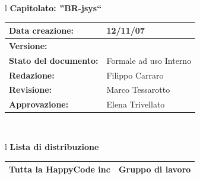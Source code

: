 \documentclass[11pt,titlepage,a4paper]{report}
\begin{document}
\begin{center}
\thispagestyle{plain}
\begin{table}[htbp]
\large{
\begin{tabular}{l}
\Large{\textbf{\textsf{Capitolato: ''BR-jsys``}}} \\
\begin{tabular}{||p{6cm}||p{6cm}||}
\hline
\textbf{Data creazione:} & 12/11/07 \\
\hline
\textbf{Versione:} & \lv \\ \hline
\textbf{Stato del documento:} & Formale ad uso Interno \\ \hline
\textbf{Redazione:} & Filippo Carraro \\ \hline
\textbf{Revisione:} & Marco Tessarotto \\ \hline
\textbf{Approvazione:}  & Elena Trivellato\\ \hline
\end{tabular} \\
\end{tabular}
}
\end{table}

\begin{table}[hbtp]
\large{
\begin{tabular}{l}
\Large{\textbf{\textsf{Lista di distribuzione}}} \\
\begin{tabular}{||p{6cm}||p{6cm}||} \hline
{Tutta la HappyCode inc}& Gruppo di lavoro \\ \hline
\end{tabular} \\
\end{tabular}
}
\end{table}


\end{center}
\end{document}
